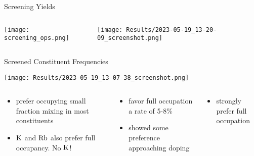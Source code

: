 \documentclass[10pt, aspectratio=169, presentation]{beamer}
\begin{document}
\begin{frame}[label={sec:orge59d790}]{Screening Yields}
\begin{columns}
\begin{column}{0.3\columnwidth}
\begin{center}
\texttt{[image: screening\_ops.png]}
\end{center}
\end{column}
\begin{column}{0.7\columnwidth}
\begin{center}
\texttt{[image: Results/2023-05-19\_13-20-09\_screenshot.png]}
\end{center}
\end{column}
\end{columns}
\end{frame}

\begin{frame}[label={sec:orge477fb2}]{Screened Constituent Frequencies}
\begin{center}
\texttt{[image: Results/2023-05-19\_13-07-38\_screenshot.png]}
\end{center}
\begin{columns}
\begin{column}{0.3\columnwidth}
\begin{itemize}
\item prefer occupying small fraction mixing in most constituents
\item \(\ce{K}\) and \(\ce{Rb}\) also prefer full occupancy. No \(\ce{K}\)!
\end{itemize}
\end{column}

\begin{column}{0.3\columnwidth}
\begin{itemize}
\item favor full occupation a rate of 5-8\%
\item showed some preference approaching doping
\end{itemize}
\end{column}

\begin{column}{0.3\columnwidth}
\begin{itemize}
\item strongly prefer full occupation
\end{itemize}
\end{column}
\end{columns}
\end{frame}
\end{document}
